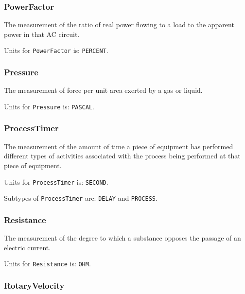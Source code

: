 \subsubsection{PowerFactor}
  \label{sec:PowerFactor}



The measurement of the ratio of real power flowing to a load to the apparent power in that AC circuit.


Units for \texttt{PowerFactor} is: \texttt{PERCENT}.

\FloatBarrier

\subsubsection{Pressure}
  \label{sec:Pressure}



The measurement of force per unit area exerted by a gas or liquid.


Units for \texttt{Pressure} is: \texttt{PASCAL}.

\FloatBarrier

\subsubsection{ProcessTimer}
  \label{sec:ProcessTimer}



The measurement of the amount of time a piece of equipment has performed different types of activities associated with the process being performed at that piece of equipment.


Units for \texttt{ProcessTimer} is: \texttt{SECOND}.


Subtypes of \texttt{ProcessTimer} are: \texttt{DELAY} and \texttt{PROCESS}. 
\FloatBarrier

\subsubsection{Resistance}
  \label{sec:Resistance}



The measurement of the degree to which a substance opposes the passage of an electric current.


Units for \texttt{Resistance} is: \texttt{OHM}.

\FloatBarrier

\subsubsection{RotaryVelocity}
  \label{sec:RotaryVelocity}




